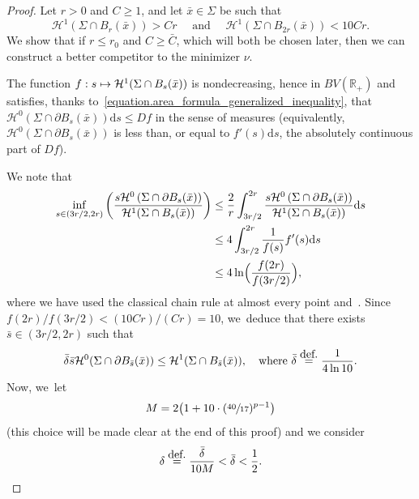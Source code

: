 \documentclass[11pt]{article}
\numberwithin{equation}{section}
\newcommand\mto{\mathchoice{\longmapsto}{\mapsto}{\mapsto}{\mapsto}}
\theoremstyle{definition}
\newcommand{\eqdef}{\ensuremath{\stackrel{\mbox{\upshape\tiny def.}}{=}}}
\newcommand\cH{\mathcal{H}}
\newcommand{\RR}{\mathbb{R}}
\newcommand\dd{\mathrm{d}}
\begin{document}
\begin{proof}
Let $r> 0$ and $C\ge 1$, and let $\bar x\in\Sigma$ be such that
\begin{equation}\label{eq.bounds_length}
\cH^1(\Sigma\cap B_r(\bar x))> Cr
\quad \text{ and }\quad
\cH^1(\Sigma\cap B_{2r}(\bar x))< 10Cr.
\end{equation}
We show that if $r\le r_0$ and $C\ge \bar C$, which will both be chosen later, then we can construct a better competitor to the minimizer $\nu$.

The function $f: s \mto \cH^1(\Sigma\cap B_s(\bar x))$ is nondecreasing, hence
in $BV(\RR_+)$ and satisfies, thanks to~\eqref{equation.area_formula_generalized_inequality}, that $\cH^0(\Sigma\cap \partial B_s(\bar x))\dd s\le Df$ in the sense of measures
(equivalently, $\cH^0(\Sigma\cap\partial B_s(\bar x))$ is less than, or equal to $f'(s)\dd s$, the absolutely continuous part of $Df$).

We note that
\begin{align*}
\inf_{s \in (3r/2,2r)} \left(\frac{s\cH^0\left(\Sigma\cap\partial B_s(\bar x)\right)}{\cH^1(\Sigma\cap B_{s}(\bar x))}\right)
&\le \frac{2}{r}\int_{3r/2}^{2r}\frac{s\cH^0\left(\Sigma\cap\partial B_s(\bar x)\right)}{\cH^1(\Sigma\cap B_{ s}(\bar x))} \dd s\\
&\le 4\int_{3r/2}^{2r} \frac{1}{f(s)} f'(s)\dd s \\
&\leq 4\ln \Bigl(\frac{f(2r)}{f(3r/2)}\Bigr),
\end{align*}
where we have used the classical chain rule at almost every point and~\cite[Cor.\,3.29]{ambrosio2000functions}. Since $f(2r)/f(3r/2)<(10Cr)/(Cr)=10$, we~deduce that there exists $\bar s\in (3r/2,2r)$ such that
\begin{equation}\label{eq:estimbars}
\bar\delta \bar s\cH^0(\Sigma\cap\partial B_{\bar s}(\bar x)) \le \cH^1(\Sigma\cap B_{\bar s}(\bar x)), \quad \text{where }\bar \delta \eqdef \frac{1}{4\ln 10}.
\end{equation}
Now, we~let
\begin{equation}\label{eq:M}
M= 2 \bigl( 1+10\cdot(\sfrac{40}{17})^{p-1} \bigr)
\end{equation}
(this choice will be made clear at the end of this proof) and we consider
\begin{equation}\label{eq:delta}
\delta \eqdef \frac{\bar\delta}{10M} <\bar \delta<\frac{1}{2}.
\end{equation}


\end{proof}
\end{document}
